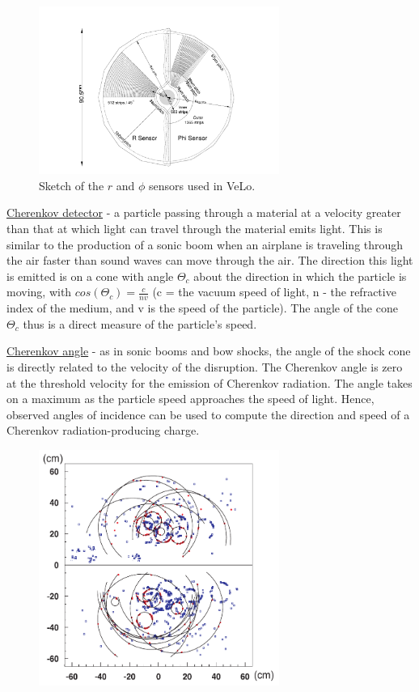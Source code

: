 \documentclass[11pt,a4paper,twoside]{article}
\begin{document}
\begin{enumerate}
\begin{figure}[H]
            \includegraphics[width=0.7\textwidth]{visuals/006-sensors-in-VeLo.png}
            
            \caption{Sketch of the $r$ and $\phi$ sensors used in VeLo.}
            \label{fig:001-LHCb_detector}
        \end{figure}

        \underline{Cherenkov detector} - a particle passing through a material at a velocity greater than that at which light can travel through the material emits light. This is similar to the production of a sonic boom when an airplane is traveling through the air faster than sound waves can move through the air. The direction this light is emitted is on a cone with angle $\Theta_c$ about the direction in which the particle is moving, with $cos(\Theta_c) = \frac{c}{nv}$ (c = the vacuum speed of light, n - the refractive index of the medium, and v is the speed of the particle). The angle of the cone $\Theta_c$ thus is a direct measure of the particle's speed. 

        \underline{Cherenkov angle} - as in sonic booms and bow shocks, the angle of the shock cone is directly related to the velocity of the disruption. The Cherenkov angle is zero at the threshold velocity for the emission of Cherenkov radiation. The angle takes on a maximum as the particle speed approaches the speed of light. Hence, observed angles of incidence can be used to compute the direction and speed of a Cherenkov radiation-producing charge.

        \begin{figure}[H]
            \centering

            \includegraphics[width=0.7\textwidth]{visuals/007-cherenkov-simulated-RICH1.png}
            

\end{figure}
\end{enumerate}
\end{document}
